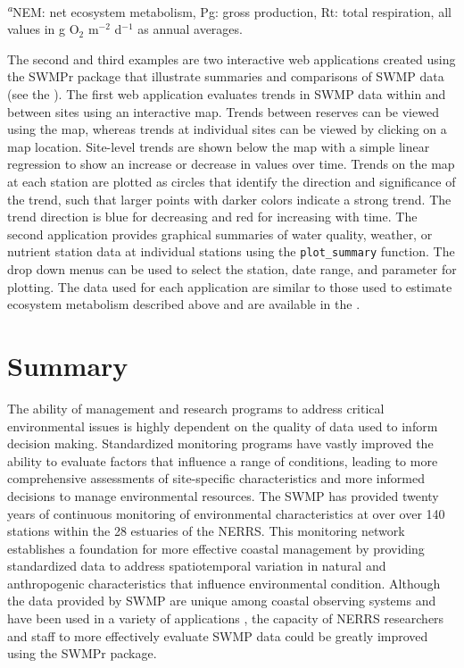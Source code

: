 \documentclass[10pt,letterpaper]{article}\usepackage[]{graphicx}\usepackage[]{color}
\begin{document}
\begin{table}[!tbp]
\footnotesize{\textsuperscript{{\it a}}NEM: net ecosystem metabolism, Pg: gross production, Rt: total respiration, all values in g O$_2$ m$^{-2}$ d$^{-1}$ as annual averages.}\end{table}


The second and third examples are two interactive web applications \cite{Chang15} created using the SWMPr package that illustrate summaries and comparisons of \ac{SWMP} data (see the ).  The first web application evaluates trends in \ac{SWMP} data within and between sites using an interactive map.  Trends between reserves can be viewed using the map, whereas trends at individual sites can be viewed by clicking on a map location.  Site-level trends are shown below the map with a simple linear regression to show an increase or decrease in values over time.  Trends on the map at each station are plotted as circles that identify the direction and significance of the trend, such that larger points with darker colors indicate a strong trend.  The trend direction is blue for decreasing and red for increasing with time.  The second application provides graphical summaries of water quality, weather, or nutrient station data at individual stations using the \texttt{plot\_summary} function. The drop down menus can be used to select the station, date range, and parameter for plotting. The data used for each application are similar to those used to estimate ecosystem metabolism described above and are available in the .  

\section*{Summary}

The ability of management and research programs to address critical environmental issues is highly dependent on the quality of data used to inform decision making.  Standardized monitoring programs have vastly improved the ability to evaluate factors that influence a range of conditions, leading to more comprehensive assessments of site-specific characteristics and more informed decisions to manage environmental resources.  The \acl{SWMP} has provided twenty years of continuous monitoring of environmental characteristics at over over 140 stations within the 28 estuaries of the \acl{NERRS}.  This monitoring network establishes a foundation  for more effective coastal management by providing standardized data to address spatiotemporal variation in natural and anthropogenic characteristics that influence environmental condition.  Although the data provided by \ac{SWMP} are unique among coastal observing systems and have been used in a variety of applications \cite{Bulthius95,Caffrey03,Sanger02,Wenner04,Dix08}, the capacity of \ac{NERRS} researchers and staff to more effectively evaluate \ac{SWMP} data could be greatly improved using the SWMPr package.
\end{document}

